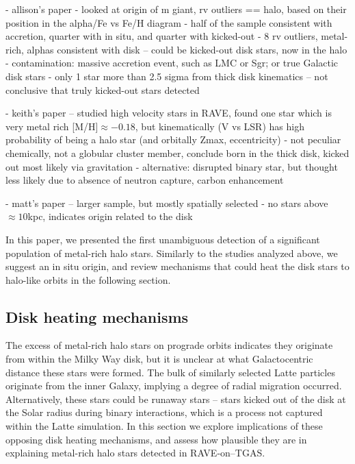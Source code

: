 \documentclass[apj, twocolappendix, numberedappendix, appendixfloats]{emulateapj}
\begin{document}
- allison's paper
- looked at origin of m giant, rv outliers == halo, based on their position in the alpha/Fe vs Fe/H diagram
- half of the sample consistent with accretion, quarter with in situ, and quarter with kicked-out
- 8 rv outliers, metal-rich, alphas consistent with disk -- could be kicked-out disk stars, now in the halo
- contamination: massive accretion event, such as LMC or Sgr; or true Galactic disk stars
- only 1 star more than 2.5 sigma from thick disk kinematics -- not conclusive that truly kicked-out stars detected

- keith's paper -- studied high velocity stars in RAVE, found one star which is very metal rich [M/H]$\approx-0.18$, but kinematically (V vs LSR) has high probability of being a halo star (and orbitally Zmax, eccentricity)
- not peculiar chemically, not a globular cluster member, conclude born in the thick disk, kicked out most likely via gravitation
- alternative: disrupted binary star, but thought less likely due to absence of neutron capture, carbon enhancement

- matt's paper -- larger sample, but mostly spatially selected
- no stars above $\approx10$\;kpc, indicates origin related to the disk

In this paper, we presented the first unambiguous detection of a significant population of metal-rich halo stars.
Similarly to the studies analyzed above, we suggest an in situ origin, and review mechanisms that could heat the disk stars to halo-like orbits in the following section.


\subsection{Disk heating mechanisms}
\label{sec:diskheating}
The excess of metal-rich halo stars on prograde orbits indicates they originate from within the Milky Way disk, but it is unclear at what Galactocentric distance these stars were formed.
The bulk of similarly selected Latte particles originate from the inner Galaxy, implying a degree of radial migration occurred.
Alternatively, these stars could be runaway stars -- stars kicked out of the disk at the Solar radius during binary interactions, which is a process not captured within the Latte simulation.
In this section we explore implications of these opposing disk heating mechanisms, and assess how plausible they are in explaining metal-rich halo stars detected in RAVE-on--TGAS.
\end{document}
